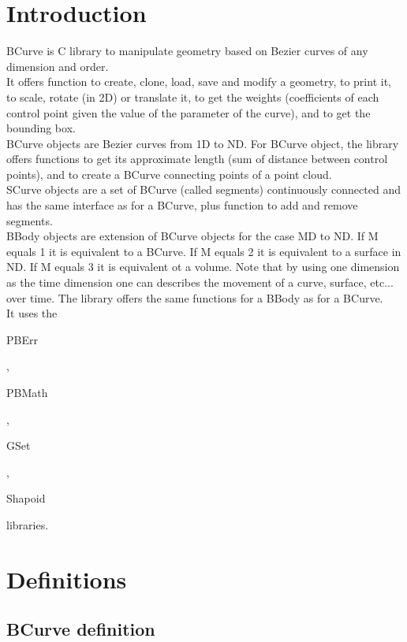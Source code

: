 \section*{Introduction}

BCurve is C library to manipulate geometry based on Bezier curves of any dimension and order.\\ 

It offers function to create, clone, load, save and modify a geometry, to print it, to scale, rotate (in 2D) or translate it, to get the weights (coefficients of each control point given the value of the parameter of the curve), and to get the bounding box.\\ 

BCurve objects are Bezier curves from 1D to ND. For BCurve object, the library offers functions to get its approximate length (sum of distance between control points), and to create a BCurve connecting points of a point cloud.\\

SCurve objects are a set of BCurve (called segments) continuously connected and has the same interface as for a BCurve, plus function to add and remove segments.\\

BBody objects are extension of BCurve objects for the case MD to ND. If M equals 1 it is equivalent to a BCurve. If M equals 2 it is equivalent to a surface in ND. If M equals 3 it is equivalent ot a volume. Note that by using one dimension as the time dimension one can describes the movement of a curve, surface, etc... over time. The library offers the same functions for a BBody as for a BCurve.\\ 

It uses the \begin{ttfamily}PBErr\end{ttfamily}, \begin{ttfamily}PBMath\end{ttfamily}, \begin{ttfamily}GSet\end{ttfamily}, \begin{ttfamily}Shapoid\end{ttfamily} libraries.\\

\section{Definitions}

\subsection{BCurve definition}

